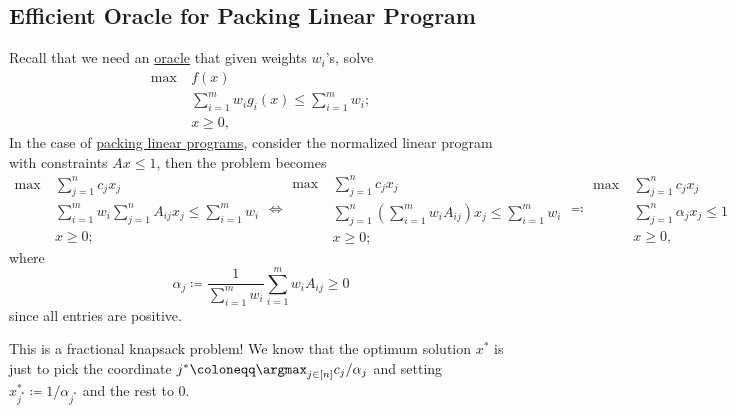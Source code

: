 \subsection{Efficient Oracle for Packing Linear Program}
Recall that we need an \hyperref[eq:MWU-oracle]{oracle} that given weights \(w_i\)'s, solve
\[
	\begin{aligned}
		\max~ & f(x)                                                \\
		      & \sum_{i=1}^{m} w_i g_i(x) \leq \sum_{i=1}^{m} w_i ; \\
		      & x \geq 0,
	\end{aligned}
\]
In the case of \hyperref[def:packing-LP]{packing linear programs}, consider the normalized linear program with constraints \(Ax \leq 1\), then the problem becomes
\begin{equation}\label{eq:MWU-oracle-LP}
	\begin{aligned}
		\max~ & \sum_{j=1}^{n} c_j x_j                                               \\
		      & \sum_{i=1}^{m} w_i \sum_{j=1}^{n} A_{ij} x_j \leq \sum_{i=1}^{m} w_i \\
		      & x\geq 0;
	\end{aligned}
	\iff \begin{aligned}
		\max~ & \sum_{j=1}^{n} c_j x_j                                                              \\
		      & \sum_{j=1}^{n} \left( \sum_{i=1}^{m} w_i A_{ij} \right) x_j \leq \sum_{i=1}^{m} w_i \\
		      & x\geq 0;
	\end{aligned}
	\eqqcolon \begin{aligned}
		\max~ & \sum_{j=1}^{n} c_j x_j              \\
		      & \sum_{j=1}^{n} \alpha _j x_j \leq 1 \\
		      & x\geq 0,
	\end{aligned}
\end{equation}
where
\[
	\alpha _j
	\coloneqq \frac{1}{\sum_{i=1}^{m} w_i} \sum_{i=1}^{m} w_i A_{ij} \geq 0
\]
since all entries are positive.

\begin{intuition}
	This is a fractional knapsack problem! We know that the optimum solution \(x^{\ast} \) is just to pick the coordinate \(j^{\ast} \coloneqq \argmax_{j \in [n]} c_j / \alpha _j\) and setting \(x^{\ast} _{j^{\ast} } \coloneqq 1 / \alpha _{j^{\ast} }\) and the rest to \(0\).
\end{intuition}

